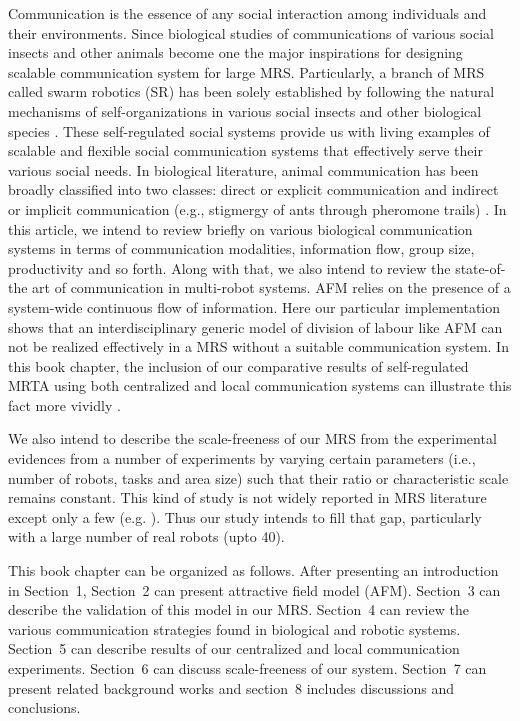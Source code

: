 \documentclass[10pt,a4paper]{article}
\begin{document}
Communication is the essence of any social interaction among individuals and their environments. Since biological studies of communications of various social insects and other animals become one the major inspirations for designing scalable communication system for large MRS. Particularly, a branch of MRS called swarm robotics (SR) has been solely established by following the natural mechanisms of self-organizations in various social insects and other biological species \cite{Bonabeau+1999}. These self-regulated social systems provide us with living examples of scalable and flexible social communication systems that effectively serve their various social needs. In biological literature, animal communication has been broadly classified into two classes: direct or explicit communication and indirect or implicit communication (e.g., stigmergy of ants through pheromone trails) \cite{Balch+1994comm,Labella2007}. In this article, we intend to review briefly on various biological communication systems in terms of communication modalities, information flow, group size, productivity and so forth. Along with that, we also intend to review the state-of-the art of communication in multi-robot systems. 
AFM relies on the presence of a system-wide continuous flow of information. Here our particular implementation shows that an interdisciplinary generic model of division of labour like AFM can not be realized effectively in a MRS without a suitable communication system. In this book chapter, the inclusion of our comparative results of self-regulated MRTA using both centralized and local communication systems can illustrate this fact more vividly \cite{Sarker+2010iros}.

We also intend to describe the scale-freeness of our MRS from the experimental evidences from a number of experiments by varying certain parameters (i.e., number of robots, tasks and area size) such that their ratio or characteristic scale remains constant. This kind of study is not widely reported in MRS literature except only a few (e.g. \cite{Gustafson+2006}). Thus our study intends to fill that gap, particularly with a large number of real robots (upto 40).

This book chapter can be organized as follows. After presenting an introduction in Section~1, Section~2 can present attractive field model (AFM). Section~3 can describe the validation of this model in our MRS. Section~4 can review the various communication strategies found in biological and robotic systems. Section~5 can describe results of our centralized and local communication experiments. Section~6 can discuss scale-freeness of our system. Section~7 can present related background works and section~8 includes discussions and conclusions.


\end{document}
